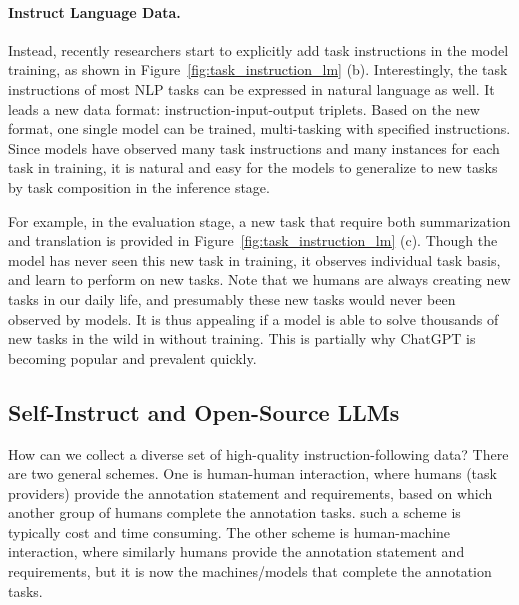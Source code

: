 \documentclass{article}
\begin{document}
\paragraph{Instruct Language Data.}
Instead, recently researchers start to explicitly add task instructions in the model training, as shown in Figure~\ref{fig:task_instruction_lm} (b). Interestingly, the task instructions of most NLP tasks can be expressed in natural language as well. It leads a new data format: instruction-input-output triplets. Based on the new format, one single model can be trained, multi-tasking with specified instructions. Since models have observed many task instructions and many instances for each task in training, it is natural and easy for the models to generalize to new tasks by task composition in the inference stage.

For example, in the evaluation stage, a new task that require both summarization and translation is provided in Figure~\ref{fig:task_instruction_lm} (c). Though the model has never seen this new task in training, it observes individual task basis, and learn to perform on new tasks. Note that we humans are always creating new tasks in our daily life, and presumably these new tasks would never been observed by models. It is thus appealing if a model is able to solve thousands of new tasks in the wild in without training. This is partially why ChatGPT is becoming popular and prevalent quickly.



\subsection{Self-Instruct and Open-Source LLMs}
\label{sec:what_is_instruct_tuning_llm}

How can we collect a diverse set of high-quality instruction-following data? There are two general schemes. One is human-human interaction, where humans (task providers) provide the annotation statement and requirements, based on which another group of humans complete the annotation tasks. such a scheme is typically cost and time consuming. The other scheme is human-machine interaction, where similarly humans provide the annotation statement and requirements, but it is now the machines/models that complete the annotation tasks. 
\end{document}
